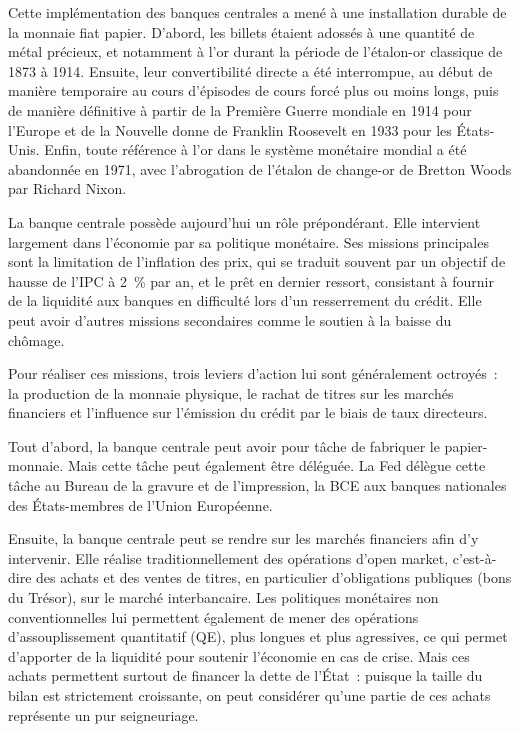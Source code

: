 Cette implémentation des banques centrales a mené à une installation durable de la monnaie fiat papier. D'abord, les billets étaient adossés à une quantité de métal précieux, et notamment à l'or durant la période de l'étalon-or classique de 1873 à 1914. Ensuite, leur convertibilité directe a été interrompue, au début de manière temporaire au cours d'épisodes de cours forcé plus ou moins longs, puis de manière définitive à partir de la Première Guerre mondiale en 1914 pour l'Europe et de la Nouvelle donne de Franklin Roosevelt en 1933 pour les États-Unis. Enfin, toute référence à l'or dans le système monétaire mondial a été abandonnée en 1971, avec l'abrogation de l'étalon de change-or de Bretton Woods par Richard Nixon.


La banque centrale possède aujourd'hui un rôle prépondérant. Elle intervient largement dans l'économie par sa politique monétaire. Ses missions principales sont la limitation de l'inflation des prix, qui se traduit souvent par un objectif de hausse de l'IPC à 2~\% par an, et le prêt en dernier ressort, consistant à fournir de la liquidité aux banques en difficulté lors d'un resserrement du crédit. Elle peut avoir d'autres missions secondaires comme le soutien à la baisse du chômage.

Pour réaliser ces missions, trois leviers d'action lui sont généralement octroyés~: la production de la monnaie physique, le rachat de titres sur les marchés financiers et l'influence sur l'émission du crédit par le biais de taux directeurs.

Tout d'abord, la banque centrale peut avoir pour tâche de fabriquer le papier-monnaie. Mais cette tâche peut également être déléguée. La Fed délègue cette tâche au Bureau de la gravure et de l'impression, la BCE aux banques nationales des États-membres de l'Union Européenne.

Ensuite, la banque centrale peut se rendre sur les marchés financiers afin d'y intervenir. Elle réalise traditionnellement des opérations d'open market, c'est-à-dire des achats et des ventes de titres, en particulier d'obligations publiques (bons du Trésor), sur le marché interbancaire. Les politiques monétaires non conventionnelles lui permettent également de mener des opérations d'assouplissement quantitatif (QE), plus longues et plus agressives, ce qui permet d'apporter de la liquidité pour soutenir l'économie en cas de crise. Mais ces achats permettent surtout de financer la dette de l'État~: puisque la taille du bilan est strictement croissante, on peut considérer qu'une partie de ces achats représente un pur seigneuriage. %

